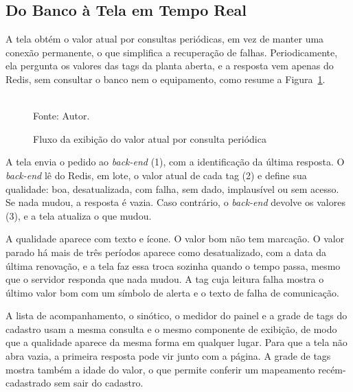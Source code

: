\subsection{Do Banco à Tela em Tempo Real}

\par A tela obtém o valor atual por consultas periódicas, em vez de manter uma conexão permanente, o que simplifica a recuperação de falhas. Periodicamente, ela pergunta os valores das tags da planta aberta, e a resposta vem apenas do Redis, sem consultar o banco nem o equipamento, como resume a Figura~\ref{fig:fx_polling}.

\begin{figure}[H]
    \centering
    \caption{Fluxo da exibição do valor atual por consulta periódica}
    \label{fig:fx_polling}
    \vspace{0.4cm}
    \vspace{0.2cm} \\
    Fonte: Autor.
\end{figure}

\par A tela envia o pedido ao \emph{back-end} (1), com a identificação da última resposta. O \emph{back-end} lê do Redis, em lote, o valor atual de cada tag (2) e define sua qualidade: boa, desatualizada, com falha, sem dado, implausível ou sem acesso. Se nada mudou, a resposta é vazia. Caso contrário, o \emph{back-end} devolve os valores (3), e a tela atualiza o que mudou.

\par A qualidade aparece com texto e ícone. O valor bom não tem marcação. O valor parado há mais de três períodos aparece como desatualizado, com a data da última renovação, e a tela faz essa troca sozinha quando o tempo passa, mesmo que o servidor responda que nada mudou. A tag cuja leitura falha mostra o último valor bom com um símbolo de alerta e o texto de falha de comunicação.

\par A lista de acompanhamento, o sinótico, o medidor do painel e a grade de tags do cadastro usam a mesma consulta e o mesmo componente de exibição, de modo que a qualidade aparece da mesma forma em qualquer lugar. Para que a tela não abra vazia, a primeira resposta pode vir junto com a página. A grade de tags mostra também a idade do valor, o que permite conferir um mapeamento recém-cadastrado sem sair do cadastro.


